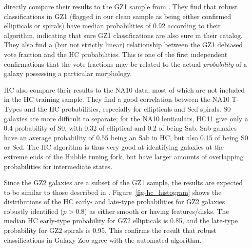 \documentclass[useAMS,usenatbib]{mn2e}
\begin{document}
\citet{hue11} directly compare their results to the GZ1 sample from \citet{lin11}. They find that robust classifications in GZ1 (flagged in our clean sample as being either confirmed ellipticals or spirals) have median probabilities of 0.92 according to their algorithm, indicating that sure GZ1 classifications are also sure in their catalog. They also find a (but not strictly linear) relationship between the GZ1 debiased vote fraction and the HC probabilities. This is one of the first independent confirmations that the vote fractions may be related to the actual {\em probability} of a galaxy possessing a particular morphology. 

HC also compare their results to the NA10 data, most of which are not included in the HC training sample. They find a good correlation between the NA10 T-Types and the HC probabilities, especially for ellipticals and Scd spirals. S0 galaxies are more difficult to separate; for the NA10 lenticulars, HC11 give only a 0.4 probability of S0, with 0.32 of elliptical and 0.2 of being Sab. Sab galaxies have an average probability of 0.55 being an Sab in HC, but also 0.15 of being S0 or Scd. The HC algorithm is thus very good at identifying galaxies at the extreme ends of the Hubble tuning fork, but have larger amounts of overlapping probabilities for intermediate states. 

Since the GZ2 galaxies are a subset of the GZ1 sample, the results are expected to be similar to those described in \citet{hue11}. Figure~\ref{fig-hc_histogram} shows the distributions of the HC early- and late-type probabilities for GZ2 galaxies robustly identified ($p > 0.8$) as either smooth or having features/disks. The median HC early-type probability for GZ2 ellipticals is 0.85, and the late-type probability for GZ2 spirals is 0.95. This confirms the result that robust classifications in Galaxy Zoo agree with the automated algorithm. 
\end{document}
